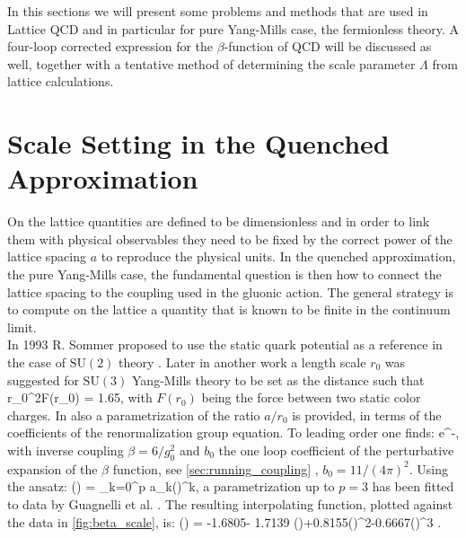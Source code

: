 In this sections we will present some problems and methods that are used in Lattice QCD and in particular for pure Yang-Mills case, the fermionless theory. A four-loop corrected expression for the $\beta$-function of QCD will be discussed as well, together with a tentative method of determining the scale parameter $\Lambda$ from lattice calculations.

\section{Scale Setting in the Quenched Approximation}
On the lattice quantities are defined to be dimensionless and in order to link them with physical observables they need to be fixed by the correct power of the lattice spacing $a$ to reproduce the physical units. In the quenched approximation, the pure Yang-Mills case, the fundamental question is then how to connect the lattice spacing to the coupling used in the gluonic action. The general strategy is to compute on the lattice a quantity that is known to be finite in the continuum limit.\\ 
In 1993 R. Sommer proposed to use the static quark potential as a reference in the case of $\mathrm{SU}(2)$ theory \cite{sommer_new_1994}. Later in another work \cite{guagnelli_precision_1998} a length scale $r_0$ was suggested for $\mathrm{SU}(3)$ Yang-Mills theory to be set as the distance such that 
\beq
r_0^2F(r_0) = 1.65,
\eeq 
with $F(r_0)$ being the force between two static color charges. In \cite{guagnelli_precision_1998} also a parametrization of the ratio $a/r_0$ is provided, in terms of the coefficients of the renormalization group equation. To leading order one finds:
\beq
     \propto e^{-},
\eeq
with inverse coupling $\beta = 6/g_0^2$ and $b_0$ the one loop coefficient of the perturbative expansion of the $\beta$ function, see \cref{sec:running_coupling}
, $b_0=11/(4\pi)^2$. Using the ansatz:
\beq
    \ln\left(\right) = \sum_{k=0}^p a_k()^k,
\eeq
a parametrization up to $p=3$ has been fitted to data by Guagnelli et al. \cite{guagnelli_precision_1998}. The resulting interpolating function, plotted against the data in \cref{fig:beta_scale}, is:
\beq
    \ln\left(\right) = -1.6805- 1.7139 ()+0.8155()^2-0.6667()^3
    \label{scale:parameter}.
\eeq

 
